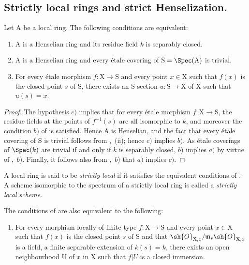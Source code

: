 \subsection{Strictly local rings and strict Henselization.}
\label{subsection:IV.18.8}


\begin{proposition}[18.8.1]
\label{IV.18.8.1}
Let $\mathrm{A}$ be a local ring.
The following conditions are equivalent:
\begin{enumerate}[label=\emph{\alph*)}]
  \item A is a Henselian ring and its residue field $k$ is separably closed.
  \item A is a Henselian ring and every \'{e}tale covering of $\mathrm{S}=\Spec(\mathrm{A})$ is trivial.
  \item For every \'{e}tale morphism $f:\mathrm{X}\to\mathrm{S}$ and every point $x\in\mathrm{X}$ such that $f(x)$ is the closed point $s$ of S, there exists an S-section $u:\mathrm{S}\to\mathrm{X}$ of X such that $u(s)=x$.
\end{enumerate}
\end{proposition}

\begin{proof}
The hypothesis $c)$ implies that for every \'{e}tale morphism $f:\mathrm{X}\to\mathrm{S}$, the residue fields at the points of $f^{-1}(s)$ are all isomorphic to $k$, and moreover the condition $b)$ of  is satisfied.
Hence A is Henselian, and the fact that every \'{e}tale covering of S is trivial follows from ,~(ii);
hence $c)$ implies $b)$.
As \'{e}tale coverings of $\Spec(k)$ are trivial if and only if $k$ is separably closed, $b)$ implies $a)$ by virtue of ,~$b$).
Finally, it follows also from ,~$b$) that $a)$ implies $c)$.
\end{proof}

\begin{definition}[18.8.2]
\label{IV.18.8.2}
A local ring is said to be \emph{strictly local} if it satisfies the equivalent conditions of .
A scheme isomorphic to the spectrum of a strictly local ring is called a \emph{strictly local scheme}.
\end{definition}

\begin{remark}[18.8.3]
\label{IV.18.8.3}
The conditions of  are also equivalent to the following:
\begin{enumerate}
  \item[d)] For every morphism locally of finite type $f:\mathrm{X}\to\mathrm{S}$ and every point $x\in\mathrm{X}$ such that $f(x)$ is the closed point $s$ of S and that $\sh{O}_{\mathrm{X},x}/\mathfrak{m}_s\sh{O}_{\mathrm{X},x}$ is a field, a finite separable extension of $k(s)=k$, there exists an open neighbourhood U of $x$ in X such that $f|U$ is a closed immersion.
\end{enumerate}
\end{remark}

